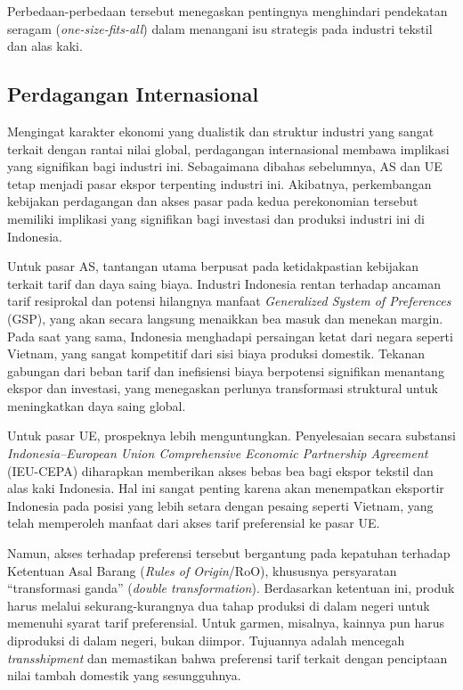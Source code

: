 \documentclass[
  manuscript=article,
  layout=publish,
  year=2026,
  volume=1,
]{den}
\begin{document}
Perbedaan-perbedaan tersebut menegaskan pentingnya menghindari
pendekatan seragam (\emph{one-size-fits-all}) dalam menangani isu
strategis pada industri tekstil dan alas kaki.

\subsection{Perdagangan Internasional}\label{perdagangan-internasional}

Mengingat karakter ekonomi yang dualistik dan struktur industri yang
sangat terkait dengan rantai nilai global, perdagangan internasional
membawa implikasi yang signifikan bagi industri ini. Sebagaimana dibahas
sebelumnya, AS dan UE tetap menjadi pasar ekspor terpenting industri
ini. Akibatnya, perkembangan kebijakan perdagangan dan akses pasar pada
kedua perekonomian tersebut memiliki implikasi yang signifikan bagi
investasi dan produksi industri ini di Indonesia.

Untuk pasar AS, tantangan utama berpusat pada ketidakpastian kebijakan
terkait tarif dan daya saing biaya. Industri Indonesia rentan terhadap
ancaman tarif resiprokal dan potensi hilangnya manfaat \emph{Generalized
System of Preferences} (GSP), yang akan secara langsung menaikkan bea
masuk dan menekan margin. Pada saat yang sama, Indonesia menghadapi
persaingan ketat dari negara seperti Vietnam, yang sangat kompetitif
dari sisi biaya produksi domestik. Tekanan gabungan dari beban tarif dan
inefisiensi biaya berpotensi signifikan menantang ekspor dan investasi,
yang menegaskan perlunya transformasi struktural untuk meningkatkan daya
saing global.

Untuk pasar UE, prospeknya lebih menguntungkan. Penyelesaian secara
substansi \emph{Indonesia--European Union Comprehensive Economic
Partnership Agreement} (IEU-CEPA) diharapkan memberikan akses bebas bea
bagi ekspor tekstil dan alas kaki Indonesia. Hal ini sangat penting
karena akan menempatkan eksportir Indonesia pada posisi yang lebih
setara dengan pesaing seperti Vietnam, yang telah memperoleh manfaat
dari akses tarif preferensial ke pasar UE.

Namun, akses terhadap preferensi tersebut bergantung pada kepatuhan
terhadap Ketentuan Asal Barang (\emph{Rules of Origin}/RoO), khususnya
persyaratan ``transformasi ganda'' (\emph{double transformation}).
Berdasarkan ketentuan ini, produk harus melalui sekurang-kurangnya dua
tahap produksi di dalam negeri untuk memenuhi syarat tarif preferensial.
Untuk garmen, misalnya, kainnya pun harus diproduksi di dalam negeri,
bukan diimpor. Tujuannya adalah mencegah \emph{transshipment} dan
memastikan bahwa preferensi tarif terkait dengan penciptaan nilai tambah
domestik yang sesungguhnya.
\end{document}
